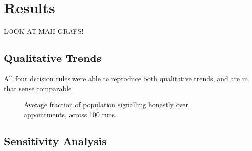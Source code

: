 \section{Results}
\label{sec:results}

LOOK AT MAH GRAFS!

\subsection{Qualitative Trends}
\label{sub:qt_results}

All four decision rules were able to reproduce both qualitative trends, and are in that sense comparable. 

\begin{figure}[h!]
\caption{Average fraction of population signalling honestly over appointments, across 100 runs.}
\label{fig:qt_honesty}
\end{figure}

\subsection{Sensitivity Analysis}
\label{sub:sa_results}

